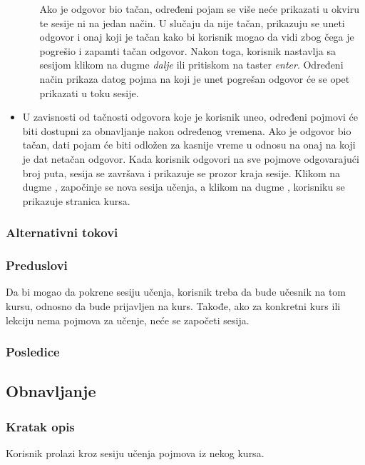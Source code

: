 \begin{itemize}
\begin{itemize}
    Ako je odgovor bio tačan, određeni pojam se više neće prikazati u okviru te sesije ni na jedan način.
    U slučaju da nije tačan, prikazuju se uneti odgovor i onaj koji je tačan kako bi korisnik mogao da vidi zbog čega je pogrešio i zapamti tačan odgovor.
    Nakon toga, korisnik nastavlja sa sesijom klikom na dugme \emph{dalje} ili pritiskom na taster \emph{enter}.
    Određeni način prikaza datog pojma na koji je unet pogrešan odgovor će se opet prikazati u toku sesije.
  \end{itemize}
  \item
  U zavisnosti od tačnosti odgovora koje je korisnik uneo, određeni pojmovi će biti dostupni za obnavljanje nakon određenog vremena.
  Ako je odgovor bio tačan, dati pojam će biti odložen za kasnije vreme u odnosu na onaj na koji je dat netačan odgovor.
  Kada korisnik odgovori na sve pojmove odgovarajući broj puta, sesija se završava i prikazuje se prozor kraja sesije.
  Klikom na dugme , započinje se nova sesija učenja, a klikom na dugme , korisniku se prikazuje stranica kursa.
\end{itemize}
\subsubsection{Alternativni tokovi}

\subsubsection{Preduslovi}
Da bi mogao da pokrene sesiju učenja, korisnik treba da bude učesnik na tom kursu, odnosno da bude prijavljen na kurs.
Takođe, ako za konkretni kurs ili lekciju nema pojmova za učenje, neće se započeti sesija.
\subsubsection{Posledice}




\subsection{Obnavljanje}
\label{subsec:obnavljanje}

\subsubsection{Kratak opis}
Korisnik prolazi kroz sesiju učenja pojmova iz nekog kursa.

